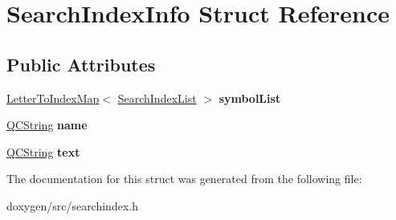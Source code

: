 \hypertarget{struct_search_index_info}{}\section{Search\+Index\+Info Struct Reference}
\label{struct_search_index_info}
\subsection*{Public Attributes}
\begin{DoxyCompactItemize}
\item 
\mbox{\label{struct_search_index_info_a783a7e51d8df1c939d70ab003dfd5585}} 
\mbox{\hyperlink{class_letter_to_index_map}{Letter\+To\+Index\+Map}}$<$ \mbox{\hyperlink{class_search_index_list}{Search\+Index\+List}} $>$ {\bfseries symbol\+List}
\item 
\mbox{\label{struct_search_index_info_aad2e21c710b230a1844ed96560bd3659}} 
\mbox{\hyperlink{class_q_c_string}{Q\+C\+String}} {\bfseries name}
\item 
\mbox{\label{struct_search_index_info_afb082bb9f140d47fbc444bc95485789c}} 
\mbox{\hyperlink{class_q_c_string}{Q\+C\+String}} {\bfseries text}
\end{DoxyCompactItemize}


The documentation for this struct was generated from the following file\+:\begin{DoxyCompactItemize}
\item 
doxygen/src/searchindex.\+h\end{DoxyCompactItemize}
